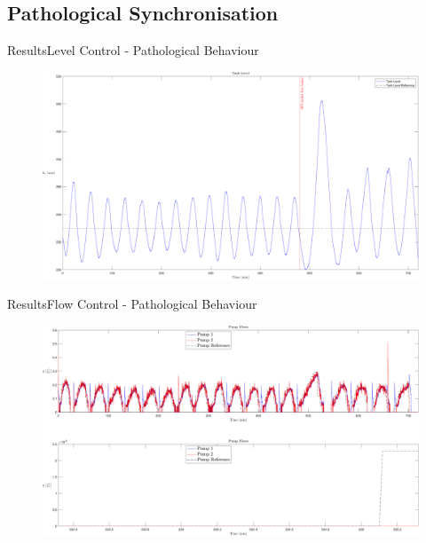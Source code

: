 \subsection{Pathological Synchronisation}

\begin{frame}{Results}{Level Control - Pathological Behaviour}
	\begin{figure}[h!]
		\includegraphics[width=\linewidth]{Graphics/OuterLoopBad.pdf}
		\label{fig:OuterLoopBad}
	\end{figure}
\end{frame}

\begin{frame}{Results}{Flow Control - Pathological Behaviour}
	\begin{figure}[h!]
		\includegraphics[width=\linewidth]{Graphics/InnerLoopBad.pdf}
		\label{fig:InnerLoopBad}
	\end{figure}
\end{frame}

